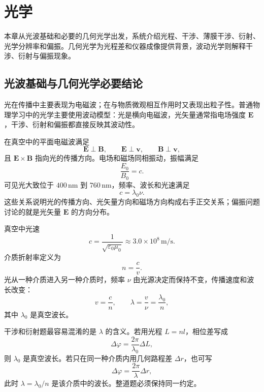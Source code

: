 %
%

\chapter{光学}

\begin{summary}[本章内容概览]
本章从光波基础和必要的几何光学出发，系统介绍光程、干涉、薄膜干涉、衍射、光学分辨率和偏振。几何光学为光程差和仪器成像提供背景，波动光学则解释干涉、衍射与偏振现象。
\end{summary}

\section{光波基础与几何光学必要结论}

光在传播中主要表现为电磁波；在与物质微观相互作用时又表现出粒子性。普通物理学习中的光学主要使用波动模型：光是横向电磁波，光矢量通常指电场强度 $\bm E$，干涉、衍射和偏振都直接反映其波动性。

在真空中的平面电磁波满足
\[
  \bm E\perp \bm B,\qquad \bm E\perp \bm v,\qquad \bm B\perp \bm v,
\]
且 $\bm E\times\bm B$ 指向光的传播方向。电场和磁场同相振动，振幅满足
\[
  \frac{E_0}{B_0}=c.
\]
可见光大致位于 $400\,\mathrm{nm}$ 到 $760\,\mathrm{nm}$，频率、波长和光速满足
\[
  c=\lambda_0\nu.
\]
这些关系说明光的传播方向、光矢量方向和磁场方向构成右手正交关系；偏振问题讨论的就是光矢量 $\bm E$ 的方向分布。

\begin{definition}[光速、折射率和波长]\label{def:refractive-index}
真空中光速
\[
  c=\frac1{\sqrt{\varepsilon_0\mu_0}}\approx3.0\times10^8\,\mathrm{m/s}.
\]
介质折射率定义为
\[
  n=\frac{c}{v}.
\]
光从一种介质进入另一种介质时，频率 $\nu$ 由光源决定而保持不变，传播速度和波长改变：
\[
  v=\frac{c}{n},\qquad \lambda=\frac{v}{\nu}=\frac{\lambda_0}{n},
\]
其中 $\lambda_0$ 是真空波长。
\end{definition}

\begin{attention}[光学公式中的波长约定]
干涉和衍射题最容易混淆的是 $\lambda$ 的含义。若用光程 $L=nl$，相位差写成
\[
  \Delta\varphi=\frac{2\pi}{\lambda_0}\Delta L,
\]
则 $\lambda_0$ 是真空波长。若只在同一种介质内用几何路程差 $\Delta r$，也可写
\[
  \Delta\varphi=\frac{2\pi}{\lambda}\Delta r,
\]
此时 $\lambda=\lambda_0/n$ 是该介质中的波长。整道题必须保持同一约定。
\end{attention}

